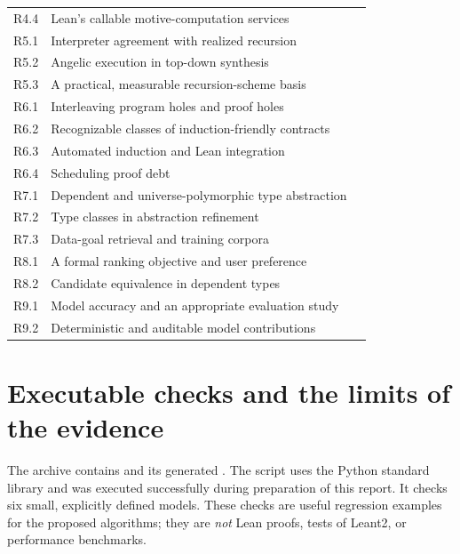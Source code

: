 \begin{longtable}{@{}p{.11\linewidth}p{.74\linewidth}r@{}}
R4.4 & Lean's callable motive-computation services & \pageref{q:R4.4}\\
R5.1 & Interpreter agreement with realized recursion & \pageref{q:R5.1}\\
R5.2 & Angelic execution in top-down synthesis & \pageref{q:R5.2}\\
R5.3 & A practical, measurable recursion-scheme basis & \pageref{q:R5.3}\\
R6.1 & Interleaving program holes and proof holes & \pageref{q:R6.1}\\
R6.2 & Recognizable classes of induction-friendly contracts & \pageref{q:R6.2}\\
R6.3 & Automated induction and Lean integration & \pageref{q:R6.3}\\
R6.4 & Scheduling proof debt & \pageref{q:R6.4}\\
R7.1 & Dependent and universe-polymorphic type abstraction & \pageref{q:R7.1}\\
R7.2 & Type classes in abstraction refinement & \pageref{q:R7.2}\\
R7.3 & Data-goal retrieval and training corpora & \pageref{q:R7.3}\\
R8.1 & A formal ranking objective and user preference & \pageref{q:R8.1}\\
R8.2 & Candidate equivalence in dependent types & \pageref{q:R8.2}\\
R9.1 & Model accuracy and an appropriate evaluation study & \pageref{q:R9.1}\\
R9.2 & Deterministic and auditable model contributions & \pageref{q:R9.2}\\
\bottomrule
\end{longtable}

\section{Executable checks and the limits of the evidence}
\label{app:checks}

The archive contains  and its generated . The script uses the Python standard library and was executed successfully during preparation of this report. It checks six small, explicitly defined models. These checks are useful regression examples for the proposed algorithms; they are \emph{not} Lean proofs, tests of Leant2, or performance benchmarks.

